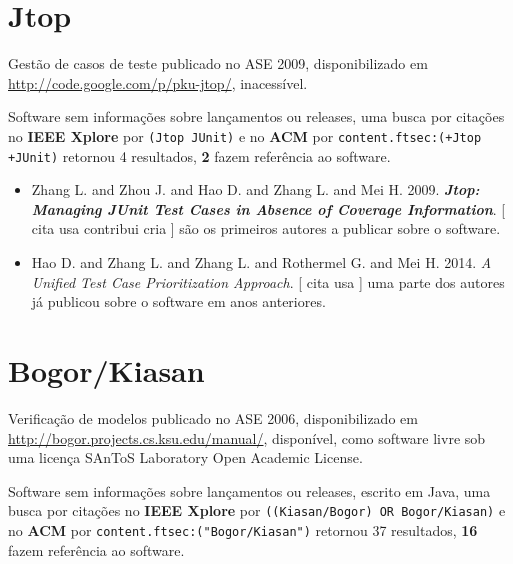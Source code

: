 \section{Jtop}

Gestão de casos de teste
publicado no ASE 2009,
disponibilizado em \url{http://code.google.com/p/pku-jtop/},
inacessível.

Software sem informações sobre lançamentos ou releases,
uma busca por citações no {\bf IEEE Xplore} por
\texttt{(Jtop JUnit)}
e no {\bf ACM} por
\texttt{content.ftsec:(+Jtop +JUnit)}
retornou
4 resultados,
{\bf 2} fazem referência ao software.

\begin{itemize}
\item Zhang L. and Zhou J. and Hao D. and Zhang L. and Mei H.
      2009.
        \textbf{\textit{ Jtop: Managing JUnit Test Cases in Absence of Coverage Information}}.
      [
          cita
          usa
          contribui
          cria
      ]
são os primeiros autores a publicar sobre o software.
\item Hao D. and Zhang L. and Zhang L. and Rothermel G. and Mei H.
      2014.
        \textit{ A Unified Test Case Prioritization Approach}.
      [
          cita
          usa
      ]
uma parte dos autores já publicou sobre o software em anos anteriores.
\end{itemize}
\section{Bogor/Kiasan}

Verificação de modelos
publicado no ASE 2006,
disponibilizado em \url{http://bogor.projects.cs.ksu.edu/manual/},
disponível,
como software livre
sob uma licença SAnToS Laboratory Open Academic License.

Software sem informações sobre lançamentos ou releases,
escrito em Java,
uma busca por citações no {\bf IEEE Xplore} por
\texttt{((Kiasan/Bogor) OR Bogor/Kiasan)}
e no {\bf ACM} por
\texttt{content.ftsec:("Bogor/Kiasan")}
retornou
37 resultados,
{\bf 16} fazem referência ao software.

